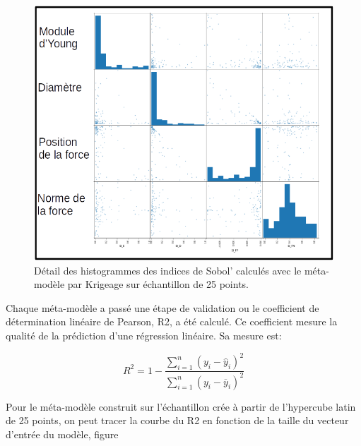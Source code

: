 \documentclass[a4paper,10pt]{article}
\begin{document}
\begin{figure}[H]
   \centering
   \noindent \includegraphics[width = \linewidth]{histogram_sobol_LHS25.png}
      \caption{Détail des histogrammes des  indices de Sobol' calculés avec le méta-modèle par Krigeage sur échantillon de 25 points.}
         \label{histogram_sobol_LHS25}
\end{figure}

Chaque méta-modèle a passé une étape de validation ou le coefficient de détermination linéaire de Pearson, R2, a été calculé. Ce coefficient mesure la qualité de la prédiction d'une régression linéaire. Sa mesure est:

\begin{equation}
R^{2} = 1 - \frac{\sum_{i=1}^{n}(y_{i}-\hat{y}_{i})^{2}}{\sum_{i=1}^{n}(y_{i}-\overline{y}_{i})^{2}}
\end{equation}

Pour le méta-modèle construit sur l'échantillon crée à partir de l'hypercube latin de 25 points, on peut tracer la courbe du R2 en fonction de la taille du vecteur d'entrée du modèle, figure \
\end{document}
